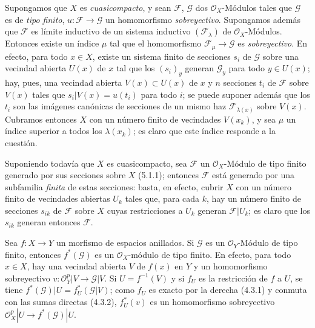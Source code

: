 \begin{env}[5.2.3]
\label{0.5.2.3-fr}
Supongamos que $X$ es \emph{cuasicompacto}, y sean $\mathcal{F}$, $\mathcal{G}$ dos
$\mathcal{O}_X$-Módulos tales que $\mathcal{G}$ es de \emph{tipo finito},
$u:\mathcal{F}\to\mathcal{G}$ un homomorfismo \emph{sobreyectivo}. Supongamos
además que $\mathcal{F}$ es límite inductivo de un sistema inductivo
$(\mathcal{F}_\lambda)$ de $\mathcal{O}_X$-Módulos. Entonces existe un índice
$\mu$ tal que el homomorfismo $\mathcal{F}_\mu\to\mathcal{G}$ es
\emph{sobreyectivo}. En efecto, para todo $x\in X$, existe un sistema finito de
secciones $s_i$ de $\mathcal{G}$ sobre una vecindad abierta $U(x)$ de $x$
tal que los $(s_i)_y$ generan $\mathcal{G}_y$ para todo $y\in U(x)$; hay,
pues, una vecindad abierta $V(x)\subset U(x)$ de $x$ y $n$ secciones $t_i$ de
$\mathcal{F}$ sobre $V(x)$ tales que
$s_i|V(x)=u(t_i)$ para todo $i$; se puede suponer además que los $t_i$ son
las imágenes canónicas de secciones de un mismo haz
$\mathcal{F}_{\lambda(x)}$ sobre $V(x)$. Cubramos entonces $X$ con un
número finito de vecindades $V(x_k)$, y sea $\mu$ un índice superior a todos
los $\lambda(x_k)$; es claro que este índice responde a la cuestión.

Suponiendo todavía que $X$ es cuasicompacto, sea $\mathcal{F}$ un
$\mathcal{O}_X$-Módulo de tipo finito generado por sus secciones sobre $X$
(5.1.1); entonces $\mathcal{F}$ está generado por una subfamilia \emph{finita}
de estas secciones: basta, en efecto, cubrir $X$ con un número finito de
vecindades abiertas $U_k$ tales que, para cada $k$, hay un número finito de
secciones $s_{ik}$ de $\mathcal{F}$ sobre $X$ cuyas restricciones a
$U_k$ generan $\mathcal{F}|U_k$; es claro que los $s_{ik}$ generan
entonces $\mathcal{F}$.
\end{env}

\begin{env}[5.2.4]
\label{0.5.2.4-fr}
Sea $f:X\to Y$ un morfismo de espacios anillados. Si $\mathcal{G}$ es un
$\mathcal{O}_Y$-Módulo de tipo finito, entonces $f^*(\mathcal{G})$ es un
$\mathcal{O}_X$-módulo de tipo finito. En efecto, para todo $x\in X$, hay una
vecindad abierta $V$ de $f(x)$ en $Y$ y un homomorfismo sobreyectivo
$v:\mathcal{O}_Y^p|V\to\mathcal{G}|V$. Si $U=f^{-1}(V)$ y si $f_U$ es la
restricción de $f$ a $U$, se tiene
$f^*(\mathcal{G})|U=f_U^*(\mathcal{G}|V)$; como $f_U$ es exacto por la derecha
(4.3.1) y conmuta con las sumas directas (4.3.2), $f_U^*(v)$ es un
homomorfismo sobreyectivo
$\mathcal{O}_X^p|U\to f^*(\mathcal{G})|U$.
\end{env}

